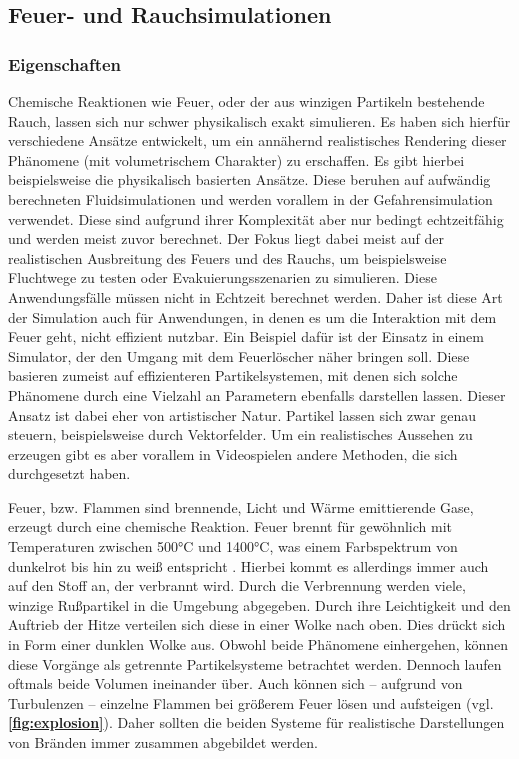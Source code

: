 \subsection{Feuer- und Rauchsimulationen}

\subsubsection{Eigenschaften}
Chemische Reaktionen wie Feuer, oder der aus winzigen Partikeln bestehende Rauch,
lassen sich nur schwer physikalisch exakt simulieren. Es haben sich hierfür verschiedene Ansätze entwickelt, um ein
annähernd realistisches Rendering dieser Phänomene (mit volumetrischem Charakter) zu erschaffen. 
Es gibt hierbei beispielsweise die physikalisch basierten Ansätze. 
Diese beruhen auf aufwändig berechneten Fluidsimulationen und werden vorallem in der Gefahrensimulation verwendet.
Diese sind aufgrund ihrer Komplexität aber nur bedingt echtzeitfähig und werden meist zuvor berechnet. 
Der Fokus liegt dabei meist auf der realistischen Ausbreitung des Feuers und des Rauchs, um beispielsweise Fluchtwege 
zu testen oder Evakuierungsszenarien zu simulieren. Diese Anwendungsfälle müssen nicht in Echtzeit berechnet werden.
Daher ist diese Art der Simulation auch für Anwendungen, in denen es um die Interaktion mit dem Feuer geht, nicht 
effizient nutzbar. Ein Beispiel dafür ist der Einsatz in einem Simulator, der den Umgang mit dem Feuerlöscher
näher bringen soll. Diese basieren zumeist auf effizienteren Partikelsystemen, mit denen sich solche Phänomene 
durch eine Vielzahl an Parametern ebenfalls darstellen lassen. Dieser Ansatz ist dabei eher von artistischer Natur. 
Partikel lassen sich zwar genau steuern, beispielsweise durch Vektorfelder. Um ein realistisches Aussehen zu 
erzeugen gibt es aber vorallem in Videospielen andere Methoden, die sich durchgesetzt haben. 

Feuer, bzw. Flammen sind brennende, Licht und Wärme emittierende Gase, erzeugt durch eine chemische Reaktion. 
Feuer brennt für gewöhnlich mit Temperaturen zwischen 500°C und 1400°C, was einem Farbspektrum von dunkelrot bis hin zu weiß entspricht \parencite{Schmidt2011}.
Hierbei kommt es allerdings immer auch auf den Stoff an, der verbrannt wird.  
Durch die Verbrennung werden viele, winzige Rußpartikel in die Umgebung abgegeben. Durch ihre Leichtigkeit und den 
Auftrieb der Hitze verteilen sich diese in einer Wolke nach oben. Dies drückt sich in Form einer dunklen Wolke aus.
Obwohl beide Phänomene einhergehen, können diese Vorgänge als getrennte Partikelsysteme betrachtet werden.
Dennoch laufen oftmals beide Volumen ineinander über. Auch können sich – aufgrund von Turbulenzen – einzelne Flammen bei größerem Feuer lösen
und aufsteigen (vgl. \textbf{\autoref{fig:explosion}}).
Daher sollten die beiden Systeme für realistische Darstellungen von Bränden immer zusammen abgebildet werden.

